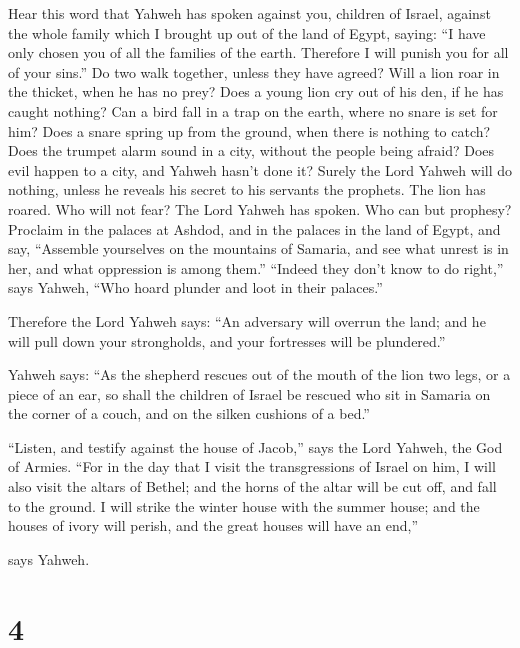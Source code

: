  Hear this word that Yahweh has spoken against you, children
of Israel, against the whole family which I brought up out of the land
of Egypt, saying:  ``I have only chosen you of all the
families of the earth. Therefore I will punish you for all of your
sins.''  Do two walk together, unless they have agreed?
 Will a lion roar in the thicket, when he has no prey? Does
a young lion cry out of his den, if he has caught nothing? 
Can a bird fall in a trap on the earth, where no snare is set for him?
Does a snare spring up from the ground, when there is nothing to catch?
 Does the trumpet alarm sound in a city, without the people
being afraid? Does evil happen to a city, and Yahweh hasn't done it?
 Surely the Lord Yahweh will do nothing, unless he reveals
his secret to his servants the prophets.  The lion has
roared. Who will not fear? The Lord Yahweh has spoken. Who can but
prophesy?  Proclaim in the palaces at Ashdod, and in the
palaces in the land of Egypt, and say, ``Assemble yourselves on the
mountains of Samaria, and see what unrest is in her, and what oppression
is among them.''  ``Indeed they don't know to do right,''
says Yahweh, ``Who hoard plunder and loot in their palaces.''

 Therefore the Lord Yahweh says: ``An adversary will
overrun the land; and he will pull down your strongholds, and your
fortresses will be plundered.''

 Yahweh says: ``As the shepherd rescues out of the mouth of
the lion two legs, or a piece of an ear, so shall the children of Israel
be rescued who sit in Samaria on the corner of a couch, and on the
silken cushions of a bed.''

 ``Listen, and testify against the house of Jacob,'' says
the Lord Yahweh, the God of Armies.  ``For in the day that
I visit the transgressions of Israel on him, I will also visit the
altars of Bethel; and the horns of the altar will be cut off, and fall
to the ground.  I will strike the winter house with the
summer house; and the houses of ivory will perish, and the great houses
will have an end,''

says Yahweh.

\hypertarget{section-3}{%
\section{4}\label{section-3}}

